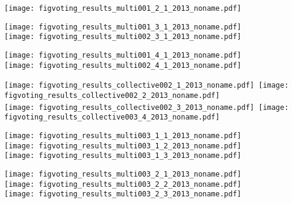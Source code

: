 \begin{frame}[plain]
\begin{frame}[plain]
\begin{frame}[plain]
\begin{frame}[plain]
\begin{frame}[plain]
\begin{frame}[plain]
\begin{frame}[plain]
\begin{frame}[plain]
\begin{frame}[plain]
\begin{frame}[plain]
\begin{frame}[plain]
\begin{frame}[plain]
  

  \texttt{[image: figvoting\_results\_multi001\_2\_1\_2013\_noname.pdf]}\\


\begin{frame}[plain]
  

  \texttt{[image: figvoting\_results\_multi001\_3\_1\_2013\_noname.pdf]}\\
  \texttt{[image: figvoting\_results\_multi002\_3\_1\_2013\_noname.pdf]}


\begin{frame}[plain]
  

  \texttt{[image: figvoting\_results\_multi001\_4\_1\_2013\_noname.pdf]}\\
  \texttt{[image: figvoting\_results\_multi002\_4\_1\_2013\_noname.pdf]}



\begin{frame}[plain]
  

  \texttt{[image: figvoting\_results\_collective002\_1\_2013\_noname.pdf]}~\texttt{[image: figvoting\_results\_collective002\_2\_2013\_noname.pdf]}\\
  \texttt{[image: figvoting\_results\_collective002\_3\_2013\_noname.pdf]}~\texttt{[image: figvoting\_results\_collective003\_4\_2013\_noname.pdf]}




  

  \texttt{[image: figvoting\_results\_multi003\_1\_1\_2013\_noname.pdf]}\\
  \texttt{[image: figvoting\_results\_multi003\_1\_2\_2013\_noname.pdf]}\\
  \texttt{[image: figvoting\_results\_multi003\_1\_3\_2013\_noname.pdf]}


  

  \texttt{[image: figvoting\_results\_multi003\_2\_1\_2013\_noname.pdf]}\\
  \texttt{[image: figvoting\_results\_multi003\_2\_2\_2013\_noname.pdf]}\\
  \texttt{[image: figvoting\_results\_multi003\_2\_3\_2013\_noname.pdf]}



\end{frame}
\end{frame}
\end{frame}
\end{frame}
\end{frame}
\end{frame}
\end{frame}
\end{frame}
\end{frame}
\end{frame}
\end{frame}
\end{frame}
\end{frame}
\end{frame}
\end{frame}
